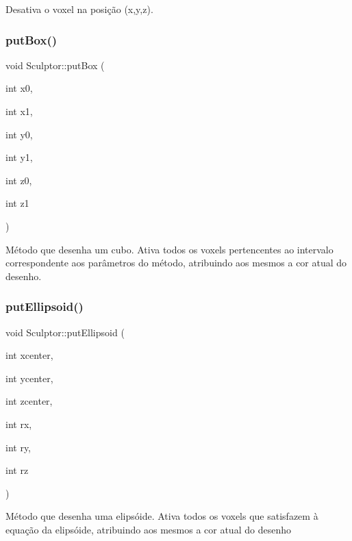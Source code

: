 Desativa o voxel na posição (x,y,z). \mbox{\label{classSculptor_a311ad7a0fb83fc67ac1f378be8e99fe1}} 
\subsubsection{\texorpdfstring{putBox()}{putBox()}}
{\footnotesize\ttfamily void Sculptor\+::put\+Box (\begin{DoxyParamCaption}\item[{int}]{x0,  }\item[{int}]{x1,  }\item[{int}]{y0,  }\item[{int}]{y1,  }\item[{int}]{z0,  }\item[{int}]{z1 }\end{DoxyParamCaption})}

Método que desenha um cubo. Ativa todos os voxels pertencentes ao intervalo correspondente aos parâmetros do método, atribuindo aos mesmos a cor atual do desenho. \mbox{\label{classSculptor_a093615b0c2b9b3a17a56300b9b939f39}} 
\subsubsection{\texorpdfstring{putEllipsoid()}{putEllipsoid()}}
{\footnotesize\ttfamily void Sculptor\+::put\+Ellipsoid (\begin{DoxyParamCaption}\item[{int}]{xcenter,  }\item[{int}]{ycenter,  }\item[{int}]{zcenter,  }\item[{int}]{rx,  }\item[{int}]{ry,  }\item[{int}]{rz }\end{DoxyParamCaption})}

Método que desenha uma elipsóide. Ativa todos os voxels que satisfazem à equação da elipsóide, atribuindo aos mesmos a cor atual do desenho \mbox{\label{classSculptor_a794a2b6ee8fc8098fd6150cb46101fc6}} 
